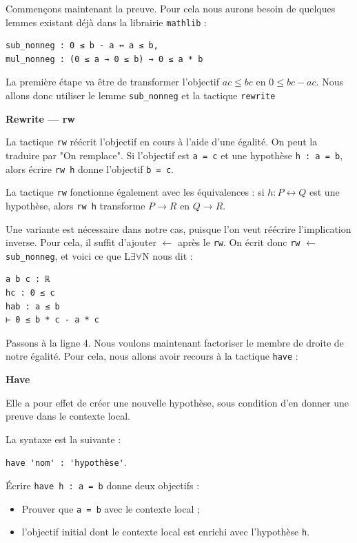 \documentclass[a4paper, 11pt, twoside]{report}
\newcommand{\LEAN}{L$\exists\forall$N }
\begin{document}
Commençons maintenant la preuve. Pour cela nous aurons besoin de quelques lemmes existant déjà dans la librairie \verb|mathlib| : 

\begin{lstlisting}
sub_nonneg : 0 ≤ b - a ↔ a ≤ b,
mul_nonneg : (0 ≤ a → 0 ≤ b) → 0 ≤ a * b 
\end{lstlisting}

La première étape va être de transformer l'objectif $ac\leq bc$ en $0 \leq bc - ac$. Nous allons donc utiliser le lemme \verb|sub_nonneg| et la tactique \verb|rewrite|

\begin{tactic}
	\centerline{\bfseries Rewrite --- rw}
	La tactique \verb|rw| réécrit l'objectif en cours à l'aide d'une égalité. On peut la traduire par "On remplace". 
	\tcblower
	Si l'objectif est \verb|a = c| et une hypothèse \verb|h : a = b|, alors écrire \verb|rw h| donne l'objectif \verb|b = c|.
\end{tactic}

La tactique \verb|rw| fonctionne également avec les équivalences : si $h : P \leftrightarrow Q$ est une hypothèse, alors \verb|rw h| transforme $P \rightarrow R$ en $Q \rightarrow R$.

Une variante est nécessaire dans notre cas, puisque l'on veut réécrire l'implication inverse. Pour cela, il suffit d'ajouter $\leftarrow$ après le \verb|rw|. On écrit donc \verb|rw| $\leftarrow$ \verb|sub_nonneg|, et voici ce que \LEAN nous dit :
\begin{lstlisting}
a b c : ℝ
hc : 0 ≤ c
hab : a ≤ b
⊢ 0 ≤ b * c - a * c
\end{lstlisting}

Passons à la ligne 4. Nous voulons maintenant factoriser le membre de droite de notre égalité. Pour cela, nous allons avoir recours à la tactique \verb|have| :

\begin{tactic}
	\centerline{\bfseries Have}
	Elle a pour effet de créer une nouvelle hypothèse, sous condition d'en donner une preuve dans le contexte local.
	
	La syntaxe est la suivante :
	
	\verb|have 'nom' : 'hypothèse'|.
	
	\tcblower
	
	Écrire \verb|have h : a = b| donne deux objectifs :
	\begin{itemize}
		\item Prouver que \verb|a = b| avec le contexte local ;
		\item l'objectif initial dont le contexte local est enrichi avec l'hypothèse \verb|h|.
	\end{itemize}
\end{tactic}
\end{document}
